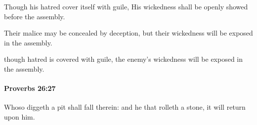 			\begin{versebox}
					\item[BHS] 
					\item[ASV] Though his hatred cover itself with guile, His wickedness shall be openly showed before the assembly.
					\item[NIV] Their malice may be concealed by deception, but their wickedness will be exposed in the assembly.
					\item[NRSV] though hatred is covered with guile, the enemy’s wickedness will be exposed in the assembly.
			\end{versebox}

		\paragraph{Proverbs 26:27} %
			\label{PROVERBS-26-27}

			Whoso diggeth a pit shall fall therein: and he that rolleth a stone, it will return upon him.

